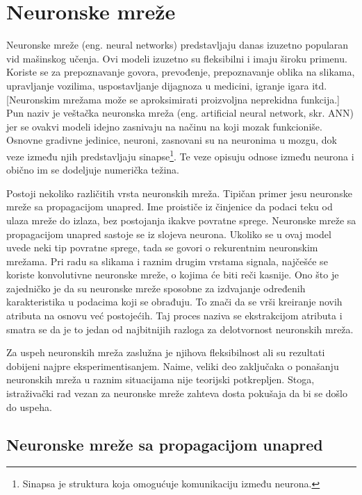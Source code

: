 \chapter{Neuronske mreže}
\label{ch:nn}

Neuronske mreže (eng. neural networks) predstavljaju danas izuzetno popularan vid mašinskog učenja. Ovi modeli izuzetno su fleksibilni i imaju široku primenu.  Koriste se za prepoznavanje govora, prevođenje, prepoznavanje oblika na slikama, upravljanje vozilima, uspostavljanje dijagnoza u medicini, igranje igara itd. [Neuronskim mrežama može se aproksimirati proizvoljna neprekidna funkcija.] Pun naziv je veštačka neuronska mreža (eng. artificial neural network, skr. ANN) jer se ovakvi modeli idejno zasnivaju na načinu na koji mozak funkcioniše. Osnovne gradivne jedinice, neuroni, zasnovani su na neuronima u mozgu, dok veze između njih predstavljaju sinapse\footnote{Sinapsa je struktura koja omogućuje komunikaciju između neurona.}. Te veze opisuju odnose između neurona i obično im se dodeljuje numerička težina.

\par
Postoji nekoliko različitih vrsta neuronskih mreža. Tipičan primer jesu neuronske mreže sa propagacijom unapred. Ime proističe iz činjenice da podaci teku od ulaza mreže do izlaza, bez postojanja ikakve povratne sprege. Neuronske mreže sa propagacijom unapred sastoje se iz slojeva neurona. Ukoliko se u ovaj model uvede neki tip povratne sprege, tada se govori o rekurentnim neuronskim mrežama. Pri radu sa slikama i raznim drugim vrstama signala, najčešće se koriste konvolutivne neuronske mreže, o kojima će biti reči kasnije. Ono što je zajedničko je da su neuronske mreže sposobne za izdvajanje određenih karakteristika u podacima koji se obrađuju. To znači da se vrši kreiranje novih atributa na osnovu već postojećih. Taj proces naziva se ekstrakcijom atributa i smatra se da je to jedan od najbitnijih razloga za delotvornost neuronskih mreža.
\par
Za uspeh neuronskih mreža zaslužna je njihova fleksibilnost ali su rezultati dobijeni najpre eksperimentisanjem. Naime, veliki deo zaključaka o ponašanju neuronskih mreža u raznim situacijama nije teorijski potkrepljen. Stoga, istraživački rad vezan za neuronske mreže zahteva dosta pokušaja da bi se došlo do uspeha.

\section{Neuronske mreže sa propagacijom unapred}

